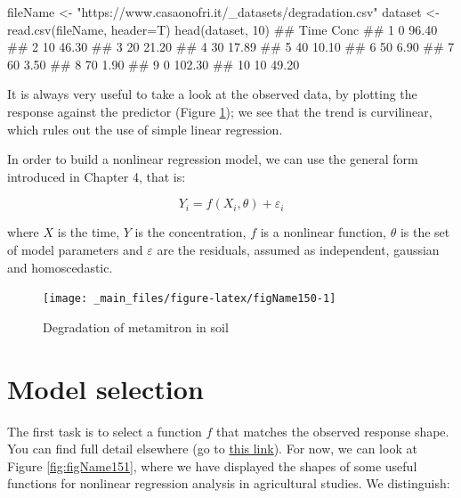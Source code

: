 \documentclass[a4paper,12pt,oneside]{book}
\newenvironment{Shaded}{\begin{snugshade}}{\end{snugshade}}
\newcommand{\DecValTok}[1]{#1}
\newcommand{\StringTok}[1]{#1}
\newcommand{\DocumentationTok}[1]{#1}
\newcommand{\OtherTok}[1]{#1}
\newcommand{\FunctionTok}[1]{#1}
\newcommand{\AttributeTok}[1]{#1}
\newcommand{\NormalTok}[1]{#1}
\begin{document}
\vspace{12pt}

\begin{Shaded}
\begin{Highlighting}[]
\NormalTok{fileName }\OtherTok{\textless{}{-}} \StringTok{"https://www.casaonofri.it/\_datasets/degradation.csv"}
\NormalTok{dataset }\OtherTok{\textless{}{-}} \FunctionTok{read.csv}\NormalTok{(fileName, }\AttributeTok{header=}\NormalTok{T)}
\FunctionTok{head}\NormalTok{(dataset, }\DecValTok{10}\NormalTok{)}
\DocumentationTok{\#\#    Time   Conc}
\DocumentationTok{\#\# 1     0  96.40}
\DocumentationTok{\#\# 2    10  46.30}
\DocumentationTok{\#\# 3    20  21.20}
\DocumentationTok{\#\# 4    30  17.89}
\DocumentationTok{\#\# 5    40  10.10}
\DocumentationTok{\#\# 6    50   6.90}
\DocumentationTok{\#\# 7    60   3.50}
\DocumentationTok{\#\# 8    70   1.90}
\DocumentationTok{\#\# 9     0 102.30}
\DocumentationTok{\#\# 10   10  49.20}
\end{Highlighting}
\end{Shaded}

It is always very useful to take a look at the observed data, by plotting the response against the predictor (Figure \ref{fig:figName150}); we see that the trend is curvilinear, which rules out the use of simple linear regression.

In order to build a nonlinear regression model, we can use the general form introduced in Chapter 4, that is:

\[Y_i = f(X_i, \theta) + \varepsilon_i\]

where \(X\) is the time, \(Y\) is the concentration, \(f\) is a nonlinear function, \(\theta\) is the set of model parameters and \(\varepsilon\) are the residuals, assumed as independent, gaussian and homoscedastic.

\begin{figure}

{\centering \texttt{[image: \_main\_files/figure-latex/figName150-1]} 

}

\caption{Degradation of metamitron in soil}\label{fig:figName150}
\end{figure}

\hypertarget{model-selection}{%
\section{Model selection}\label{model-selection}}

The first task is to select a function \(f\) that matches the observed response shape. You can find full detail elsewhere (go to \href{https://www.statforbiology.com/2020/stat_nls_usefulfunctions/}{this link}). For now, we can look at Figure \ref{fig:figName151}, where we have displayed the shapes of some useful functions for nonlinear regression analysis in agricultural studies. We distinguish:
\end{document}
